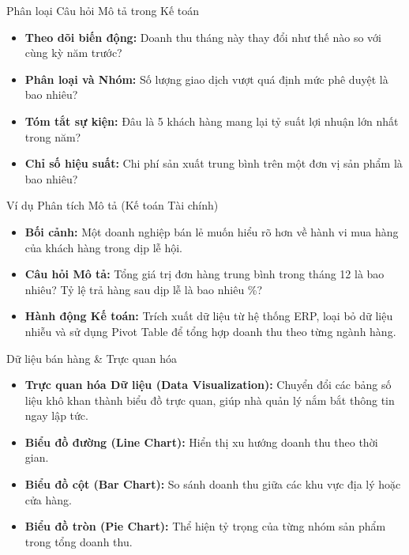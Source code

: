 \documentclass[aspectratio=169,12pt]{beamer}
\begin{document}
\begin{frame}{Phân loại Câu hỏi Mô tả trong Kế toán}
\begin{itemize}
    \item \textbf{Theo dõi biến động:} Doanh thu tháng này thay đổi như thế nào so với cùng kỳ năm trước?
    \item \textbf{Phân loại và Nhóm:} Số lượng giao dịch vượt quá định mức phê duyệt là bao nhiêu?
    \item \textbf{Tóm tắt sự kiện:} Đâu là 5 khách hàng mang lại tỷ suất lợi nhuận lớn nhất trong năm?
    \item \textbf{Chỉ số hiệu suất:} Chi phí sản xuất trung bình trên một đơn vị sản phẩm là bao nhiêu?
\end{itemize}
\end{frame}

\begin{frame}{Ví dụ Phân tích Mô tả (Kế toán Tài chính)}
\begin{itemize}
    \item \textbf{Bối cảnh:} Một doanh nghiệp bán lẻ muốn hiểu rõ hơn về hành vi mua hàng của khách hàng trong dịp lễ hội.
    \item \textbf{Câu hỏi Mô tả:} Tổng giá trị đơn hàng trung bình trong tháng 12 là bao nhiêu? Tỷ lệ trả hàng sau dịp lễ là bao nhiêu \%?
    \item \textbf{Hành động Kế toán:} Trích xuất dữ liệu từ hệ thống ERP, loại bỏ dữ liệu nhiễu và sử dụng Pivot Table để tổng hợp doanh thu theo từng ngành hàng.
\end{itemize}
\end{frame}

\begin{frame}{Dữ liệu bán hàng \& Trực quan hóa}
\begin{itemize}
    \item \textbf{Trực quan hóa Dữ liệu (Data Visualization):} Chuyển đổi các bảng số liệu khô khan thành biểu đồ trực quan, giúp nhà quản lý nắm bắt thông tin ngay lập tức.
    \item \textbf{Biểu đồ đường (Line Chart):} Hiển thị xu hướng doanh thu theo thời gian.
    \item \textbf{Biểu đồ cột (Bar Chart):} So sánh doanh thu giữa các khu vực địa lý hoặc cửa hàng.
    \item \textbf{Biểu đồ tròn (Pie Chart):} Thể hiện tỷ trọng của từng nhóm sản phẩm trong tổng doanh thu.
\end{itemize}
\end{frame}
\end{document}
